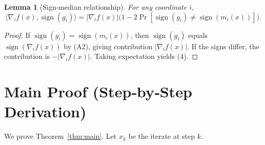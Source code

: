 \documentclass{article}
\newtheorem{lemma}{Lemma}
\newcommand{\sign}{\operatorname{sign}}
\newcommand{\ip}[2]{\langle #1,#2\rangle}
\begin{document}
\begin{lemma}[Sign‑median relationship]\label{lem:signmedian}
For any coordinate $i$,
\[
\ip{\nabla_i f(x)}{\sign(g_i)}=
|\nabla_i f(x)|\bigl(1-2\Pr[\sign(g_i)\neq\sign(m_i(x))]\bigr) .
\tag{4}
\]
\end{lemma}
\begin{proof}
If $\sign(g_i)=\sign(m_i(x))$, then $\sign(g_i)$ equals $\sign(\nabla_i f(x))$ by (A2), giving contribution $|\nabla_i f(x)|$. If the signs differ, the contribution is $-|\nabla_i f(x)|$. Taking expectation yields (4). \end{proof}

\section*{Main Proof (Step‑by‑Step Derivation)}
We prove Theorem~\ref{thm:main}. Let $x_k$ be the iterate at step $k$.
\end{document}

